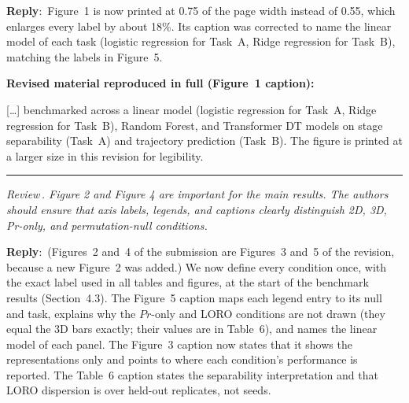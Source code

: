 \documentclass[11pt]{article}
\newcounter{reviewer}
\newcounter{point}[reviewer]
\renewcommand{\thepoint}{Review\,\thereviewer.\arabic{point}}
\newcommand{\point}[1]{\refstepcounter{point}  \bigskip \hrule \medskip \noindent \textit{{\fontseries{b}\selectfont \thepoint } #1}\par}
\newcommand{\reply}{\medskip \noindent \textbf{Reply}:\ }
\newcommand{\revisedheading}[1]{\medskip\noindent\textbf{Revised material
  reproduced in full (#1):}\par}
\newenvironment{revised}{\par\color{red}}{\par}
\begin{document}
\reply{Figure~1 is now printed at 0.75 of the page width instead of 0.55, which enlarges every label by about 18\%. Its caption was corrected to name the linear model of each task (logistic regression for Task~A, Ridge regression for Task~B), matching the labels in Figure~5.}

\revisedheading{Figure~1 caption}
\begin{revised}
[\ldots] benchmarked across a linear model (logistic regression for Task~A, Ridge regression for Task~B), Random Forest, and Transformer DT models on stage separability (Task~A) and trajectory prediction (Task~B). The figure is printed at a larger size in this revision for legibility.
\end{revised}

\point{ Figure 2 and Figure 4 are important for the main results. The authors should ensure that axis labels, legends, and captions clearly distinguish 2D, 3D, Pr-only, and permutation-null conditions.}

\reply{(Figures~2 and~4 of the submission are Figures~3 and~5 of the revision, because a new Figure~2 was added.) We now define every condition once, with the exact label used in all tables and figures, at the start of the benchmark results (Section~4.3). The Figure~5 caption maps each legend entry to its null and task, explains why the $Pr$-only and LORO conditions are not drawn (they equal the 3D bars exactly; their values are in Table~6), and names the linear model of each panel. The Figure~3 caption now states that it shows the representations only and points to where each condition's performance is reported. The Table~6 caption states the separability interpretation and that LORO dispersion is over held-out replicates, not seeds.}
\end{document}
